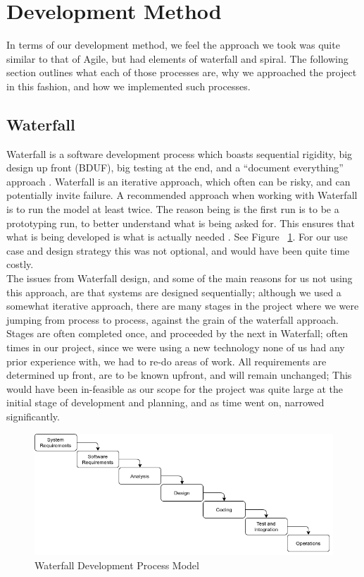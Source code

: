\section{Development Method}
In terms of our development method, we feel the approach we took was quite similar to that of Agile, but had elements of waterfall and spiral. The following section outlines what each of those processes are, why we approached the project in this fashion, and how we implemented such processes.
\subsection{Waterfall}
Waterfall is a software development process which boasts sequential rigidity, big design up front (BDUF), big testing at the end, and a “document everything” approach \cite{palmquist2013parallel}. Waterfall is an iterative approach, which often can be risky, and can potentially invite failure. A recommended approach when working with Waterfall is to run the model at least twice. The reason being is the first run is to be a prototyping run, to better understand what is being asked for. This ensures that what is being developed is what is actually needed \cite{palmquist2013parallel}. See Figure ~\ref{image:waterfallModel}. For our use case and design strategy this was not optional, and would have been quite time costly.
\\ The issues from Waterfall design, and some of the main reasons for us not using this approach, are that systems are designed sequentially; although we used a somewhat iterative approach, there are many stages in the project where we were jumping from process to process, against the grain of the waterfall approach. Stages are often completed once, and proceeded by the next in Waterfall; often times in our project, since we were using a new technology none of us had any prior experience with, we had to re-do areas of work. All requirements are determined up front, are to be known upfront, and will remain unchanged; This would have been in-feasible as our scope for the project was quite large at the initial stage of development and planning, and as time went on, narrowed significantly. 

\begin{figure}[h!]
    \caption{Waterfall Development Process Model}
    \label{image:waterfallModel}
    \centering
    \includegraphics[width=1.0\textwidth]{images/WaterfallModel.png}
\end{figure}

